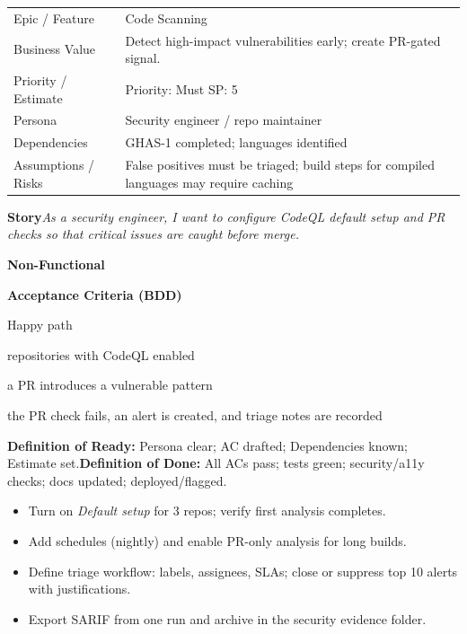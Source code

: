 \documentclass[11pt,a4paper]{article}
\newcommand{\cb}{\(\square\)}
\newenvironment{GHASCard}[2]{%
  \begin{tcolorbox}[ghascard,title={\ghasheader{#1 --- #2}}]
  \small
}{%
  \end{tcolorbox}
}
\newenvironment{GHASTasks}{%
  \begin{tcolorbox}[ghastasks]
  \small
  \begin{itemize}[label=\cb, leftmargin=*, labelsep=0.6em]
}{%
  \end{itemize}
  \end{tcolorbox}
}
\newcommand{\DoR}{\textbf{Definition of Ready:} Persona clear; AC drafted; Dependencies known; Estimate set.}
\newcommand{\DoD}{\textbf{Definition of Done:} All ACs pass; tests green; security/a11y checks; docs updated; deployed/flagged.}
\begin{document}
\begin{GHASCard}{GHAS-2}{Code Scanning with CodeQL (Essentials)}
\begin{tabularx}{\linewidth}{L V}
Epic / Feature & Code Scanning \tabularnewline
Business Value & Detect high-impact vulnerabilities early; create PR-gated signal. \tabularnewline
Priority / Estimate & Priority: Must \quad SP: 5 \tabularnewline
Persona & Security engineer / repo maintainer \tabularnewline
Dependencies & GHAS-1 completed; languages identified \tabularnewline
Assumptions / Risks & False positives must be triaged; build steps for compiled languages may require caching \tabularnewline
\end{tabularx}

\medskip
\textbf{Story}\quad \emph{As a security engineer, I want to configure CodeQL default setup and PR checks so that critical issues are caught before merge.}

\medskip
\textbf{Non-Functional}\quad
{}\ 

\medskip
\textbf{Acceptance Criteria (BDD)}
\begin{description}[leftmargin=2.7cm, labelwidth=2.6cm, style=nextline]
  \item[\textbf{Scenario}] Happy path
  \item[\textbf{Given}] repositories with CodeQL enabled
  \item[\textbf{When}] a PR introduces a vulnerable pattern
  \item[\textbf{Then}] the PR check fails, an alert is created, and triage notes are recorded
\end{description}

\medskip
\DoR\quad\textbullet\quad\DoD
\end{GHASCard}

\begin{GHASTasks}
\item Turn on \emph{Default setup} for 3 repos; verify first analysis completes.
\item Add schedules (nightly) and enable PR-only analysis for long builds.
\item Define triage workflow: labels, assignees, SLAs; close or suppress top 10 alerts with justifications.
\item Export SARIF from one run and archive in the security evidence folder.
\end{GHASTasks}
\clearpage
\end{document}
